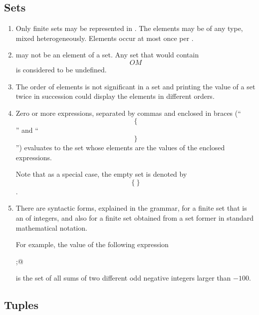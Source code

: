 \subsection{Sets}
    \begin{enumerate}
    \item
    Only finite sets may be represented in \ISETL{}\@.
    The elements may be of any type, mixed heterogeneously.
    Elements occur at most once per .

    \item
     may not be an element of a set.
    Any set that would contain \[OM\] is considered to be undefined.

    \item
    The order of elements is not significant
    in a set and printing the value
    of a set twice in succession could display the elements in
    different orders.

    \item
    Zero or more expressions, separated by commas and enclosed in
    braces (``\[\{\]'' and ``\[\}\]'') evaluates to
    the set whose elements are the values of the
    enclosed expressions.

    Note that as a special case, the empty set is denoted by \[\{~\}\].

    \item
    There are syntactic forms, explained in the grammar, for a finite set
    that is an  of integers,
    and also for a finite set
    obtained from a set former in standard mathematical notation.

    For example, the value of the following expression

\CS
{};@
\CE

    is the set of all sums of two different odd negative integers
    larger than $-100$.
    \end{enumerate}

\subsection{Tuples}

